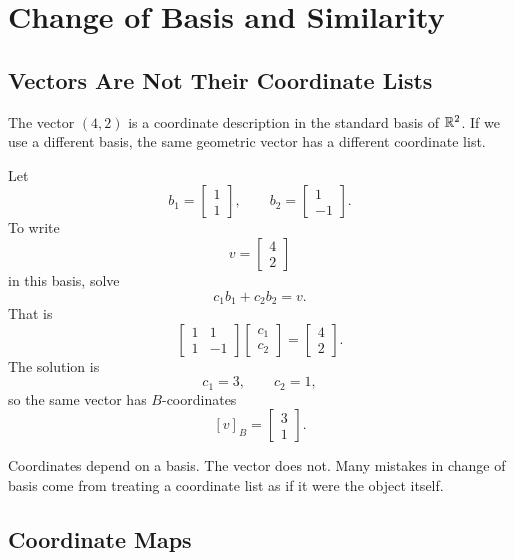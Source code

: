\chapter{Change of Basis and Similarity}
\label{ch:change-basis-similarity}

\section{Vectors Are Not Their Coordinate Lists}

The vector $(4,2)$ is a coordinate description in the standard basis of
$\mathbb{R}^2$. If we use a different basis, the same geometric vector has a different
coordinate list.

Let
\[
  b_1=\begin{bmatrix}1\\1\end{bmatrix},
  \qquad
  b_2=\begin{bmatrix}1\\-1\end{bmatrix}.
\]
To write
\[
  v=\begin{bmatrix}4\\2\end{bmatrix}
\]
in this basis, solve
\[
  c_1b_1+c_2b_2=v.
\]
That is
\[
  \begin{bmatrix}
  1&1\\
  1&-1
  \end{bmatrix}
  \begin{bmatrix}c_1\\c_2\end{bmatrix}
  =
  \begin{bmatrix}4\\2\end{bmatrix}.
\]
The solution is
\[
  c_1=3,\qquad c_2=1,
\]
so the same vector has $B$-coordinates
\[
  [v]_B=\begin{bmatrix}3\\1\end{bmatrix}.
\]

\begin{warningbox}
Coordinates depend on a basis. The vector does not. Many mistakes in change
of basis come from treating a coordinate list as if it were the object itself.
\end{warningbox}

\section{Coordinate Maps}

